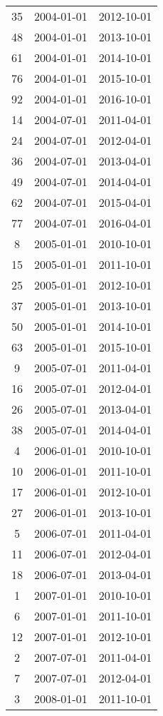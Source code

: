 \begin{tabular}{ccc}
  35 & 2004-01-01 & 2012-10-01 \\ 
  48 & 2004-01-01 & 2013-10-01 \\ 
  61 & 2004-01-01 & 2014-10-01 \\ 
  76 & 2004-01-01 & 2015-10-01 \\ 
  92 & 2004-01-01 & 2016-10-01 \\ 
  14 & 2004-07-01 & 2011-04-01 \\ 
  24 & 2004-07-01 & 2012-04-01 \\ 
  36 & 2004-07-01 & 2013-04-01 \\ 
  49 & 2004-07-01 & 2014-04-01 \\ 
  62 & 2004-07-01 & 2015-04-01 \\ 
  77 & 2004-07-01 & 2016-04-01 \\ 
  8 & 2005-01-01 & 2010-10-01 \\ 
  15 & 2005-01-01 & 2011-10-01 \\ 
  25 & 2005-01-01 & 2012-10-01 \\ 
  37 & 2005-01-01 & 2013-10-01 \\ 
  50 & 2005-01-01 & 2014-10-01 \\ 
  63 & 2005-01-01 & 2015-10-01 \\ 
  9 & 2005-07-01 & 2011-04-01 \\ 
  16 & 2005-07-01 & 2012-04-01 \\ 
  26 & 2005-07-01 & 2013-04-01 \\ 
  38 & 2005-07-01 & 2014-04-01 \\ 
  4 & 2006-01-01 & 2010-10-01 \\ 
  10 & 2006-01-01 & 2011-10-01 \\ 
  17 & 2006-01-01 & 2012-10-01 \\ 
  27 & 2006-01-01 & 2013-10-01 \\ 
  5 & 2006-07-01 & 2011-04-01 \\ 
  11 & 2006-07-01 & 2012-04-01 \\ 
  18 & 2006-07-01 & 2013-04-01 \\ 
  1 & 2007-01-01 & 2010-10-01 \\ 
  6 & 2007-01-01 & 2011-10-01 \\ 
  12 & 2007-01-01 & 2012-10-01 \\ 
  2 & 2007-07-01 & 2011-04-01 \\ 
  7 & 2007-07-01 & 2012-04-01 \\ 
  3 & 2008-01-01 & 2011-10-01 \\ 
   \hline
\end{tabular}
